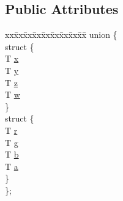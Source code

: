 \subsection*{Public Attributes}
\begin{DoxyCompactItemize}
\item 
\begin{tabbing}
xx\=xx\=xx\=xx\=xx\=xx\=xx\=xx\=xx\=\kill
union \{\\
\>struct \{\\
\>\>T \mbox{\hyperlink{structpad_1_1math_1_1_vector4_a977619c0dbd2e7060bb1f839d3fa8337}{x}}\\
\>\>T \mbox{\hyperlink{structpad_1_1math_1_1_vector4_a2461711530968b1c7c5ff1256a5a6098}{y}}\\
\>\>T \mbox{\hyperlink{structpad_1_1math_1_1_vector4_a9407faaccb5b094aeb3cadc36e71755e}{z}}\\
\>\>T \mbox{\hyperlink{structpad_1_1math_1_1_vector4_abbbd617d5083a886936724282216bee4}{w}}\\
\>\} \\
\>struct \{\\
\>\>T \mbox{\hyperlink{structpad_1_1math_1_1_vector4_a2288e82eaf6dd6c283f4714503b13096}{r}}\\
\>\>T \mbox{\hyperlink{structpad_1_1math_1_1_vector4_ac4a05c791e0522930bed20045239e870}{g}}\\
\>\>T \mbox{\hyperlink{structpad_1_1math_1_1_vector4_a00d2630fa1befcfa4c343e2f4187ec71}{b}}\\
\>\>T \mbox{\hyperlink{structpad_1_1math_1_1_vector4_afb5d50917f750bbe417871b7f290b10c}{a}}\\
\>\} \\
\}; \\


\end{tabbing}
\end{DoxyCompactItemize}
